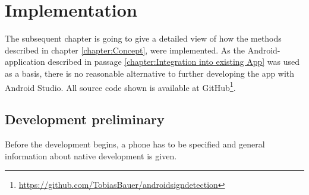 

\chapter{Implementation}\label{chapter:Implementation}
The subsequent chapter is going to give a detailed view of how the methods described in chapter \ref{chapter:Concept}, were implemented. 
As the Android-application described in passage \ref{chapter:Integration into existing App} was used as a basis, there is no reasonable alternative to further developing the app with Android Studio. All source code shown is available at GitHub\footnote{\url{https://github.com/TobiasBauer/androidsigndetection}}.
\section{Development preliminary}
Before the development begins, a phone has to be specified and general information about native development is given.
